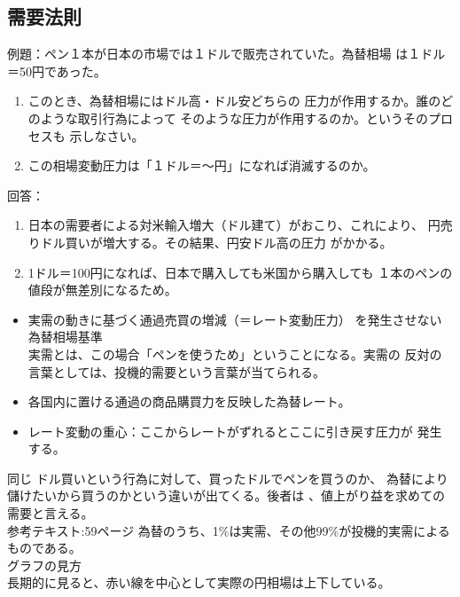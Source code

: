 \documentclass{jsarticle}
\begin{document}
\subsection{需要法則}
例題：ペン１本が日本の市場では１ドルで販売されていた。為替相場
は１ドル＝50円であった。
\begin{enumerate}
  \item このとき、為替相場にはドル高・ドル安どちらの
  圧力が作用するか。誰のどのような取引行為によって
  そのような圧力が作用するのか。というそのプロセスも
  示しなさい。
  \item この相場変動圧力は「１ドル＝〜円」になれば消滅するのか。
\end{enumerate}
回答：
\begin{enumerate}
  \item 日本の需要者による対米輸入増大（ドル建て）がおこり、これにより、
  円売りドル買いが増大する。その結果、円安ドル高の圧力
  がかかる。
  \item 1ドル＝100円になれば、日本で購入しても米国から購入しても
  １本のペンの値段が無差別になるため。

\end{enumerate}

\begin{itemize}
  \item 実需の動きに基づく通過売買の増減（＝レート変動圧力）
  を発生させない為替相場基準\\
  実需とは、この場合「ペンを使うため」ということになる。実需の
  反対の言葉としては、投機的需要という言葉が当てられる。
  \item 各国内に置ける通過の商品購買力を反映した為替レート。
  \item レート変動の重心：ここからレートがずれるとここに引き戻す圧力が
  発生する。
\end{itemize}
同じ
ドル買いという行為に対して、買ったドルでペンを買うのか、
為替により儲けたいから買うのかという違いが出てくる。後者は
、値上がり益を求めての需要と言える。
\\参考テキスト:59ページ
為替のうち、1\%は実需、その他99\%が投機的実需によるものである。\\
グラフの見方\\
長期的に見ると、赤い線を中心として実際の円相場は上下している。\\
\end{document}
